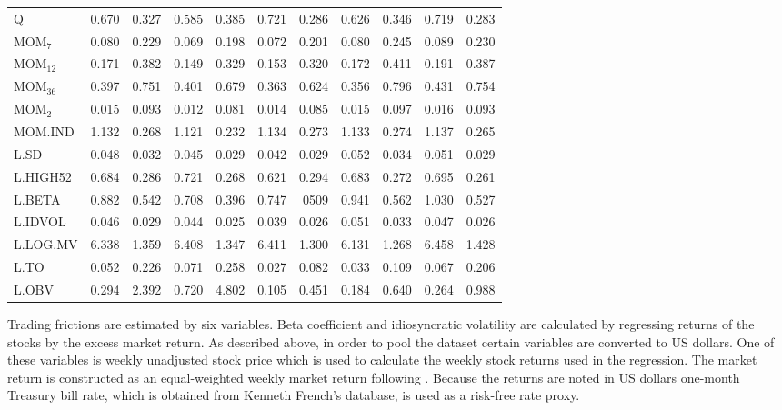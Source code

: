\documentclass[12pt]{article}
\begin{document}
\begin{table}[ht]
\begin{tabularx}{\textwidth}{@{\extracolsep{1pt}} X r r r r r r r r r r}
Q			& 0.670 	& 0.327	& 0.585 	& 0.385	& 0.721	& 0.286	& 0.626	& 0.346	& 0.719 	& 0.283 \\
MOM$_{7}$ 	& 0.080 	& 0.229	& 0.069 	& 0.198	& 0.072	& 0.201	& 0.080	& 0.245	& 0.089	& 0.230 \\
MOM$_{12}$ 	& 0.171	& 0.382	& 0.149 	& 0.329	& 0.153	& 0.320	& 0.172	& 0.411	& 0.191	& 0.387 \\
MOM$_{36}$ 	& 0.397	& 0.751	& 0.401 	& 0.679	& 0.363	& 0.624	& 0.356	& 0.796	& 0.431	& 0.754 \\
MOM$_{2}$ 	& 0.015 	& 0.093	& 0.012 	& 0.081	& 0.014	& 0.085	& 0.015	& 0.097	& 0.016	& 0.093 \\ 
MOM.IND 	& 1.132 	& 0.268	& 1.121 	& 0.232	& 1.134	& 0.273	& 1.133	& 0.274	& 1.137	& 0.265 \\
L.SD	 		& 0.048	& 0.032	& 0.045 	& 0.029	& 0.042	& 0.029	& 0.052	& 0.034	& 0.051	& 0.029 \\
L.HIGH52		& 0.684 	& 0.286	& 0.721 	& 0.268	& 0.621	& 0.294	& 0.683	& 0.272	& 0.695	& 0.261 \\
L.BETA	 	& 0.882 	& 0.542	& 0.708 	& 0.396	& 0.747	& 0509	& 0.941	& 0.562	& 1.030	& 0.527 \\
L.IDVOL	 	& 0.046 	& 0.029	& 0.044 	& 0.025	& 0.039	& 0.026	& 0.051	& 0.033	& 0.047	& 0.026 \\ 
L.LOG.MV	& 6.338  	& 1.359	& 6.408 	& 1.347	& 6.411	& 1.300	& 6.131	& 1.268	& 6.458	& 1.428 \\ 
L.TO		 	& 0.052  	& 0.226	& 0.071 	& 0.258	& 0.027	& 0.082	& 0.033	& 0.109	& 0.067	& 0.206 \\
L.OBV		& 0.294 	& 2.392	& 0.720 	& 4.802	& 0.105	& 0.451	& 0.184	& 0.640	& 0.264	& 0.988 \\ 
\bottomrule
\end{tabularx}
\end{table} 

Trading frictions are estimated by six variables. Beta coefficient and idiosyncratic volatility are calculated by regressing returns of the stocks by the excess market return. As described above, in order to pool the dataset certain variables are converted to US dollars. One of these variables is weekly unadjusted stock price which is used to calculate the weekly stock returns used in the regression. The market return is constructed as an equal-weighted weekly market return following \citet*{Green2017}.\footnotemark {} Because the returns are noted in US dollars one-month Treasury bill rate, which is obtained from Kenneth French's database\footnotemark {}, is used as a risk-free rate proxy. \par
\end{document}
